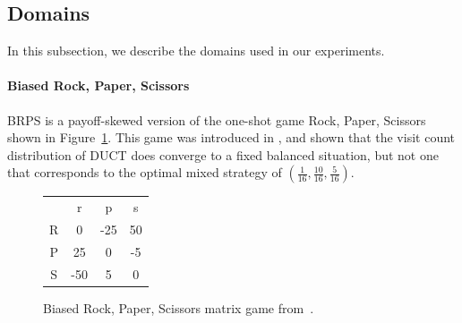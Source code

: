 \subsection{Domains}

In this subsection, we describe the domains used in our experiments.

\paragraph{\textbf{Biased Rock, Paper, Scissors}} 
BRPS is a payoff-skewed version of the one-shot game Rock, Paper, Scissors shown in 
Figure~\ref{fig:brps}. This game was introduced in \cite{Shafiei09}, and shown that the visit count distribution of 
DUCT does converge to a fixed balanced situation, but not one that 
corresponds to the optimal mixed strategy of $(\frac{1}{16},\frac{10}{16},\frac{5}{16})$. 

\begin{figure}[h!]
\begin{center}
\begin{tabular}{c|c|c|c|}
 \multicolumn{1}{c}{~} & \multicolumn{1}{c}{r}  &  \multicolumn{1}{c}{p} &  \multicolumn{1}{c}{s}\\\cline{2-4}
R &  0  & -25& 50\\\cline{2-4}
P &  25 &  0 & -5\\\cline{2-4}
S & -50 &  5 &  0\\\cline{2-4}
\end{tabular}
\end{center}
\caption{Biased Rock, Paper, Scissors matrix game from~\cite{Shafiei09}. \label{fig:brps}}
\end{figure}

